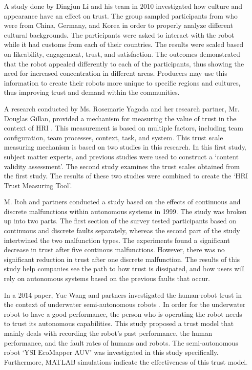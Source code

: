 \documentclass[runningheads,a4paper]{llncs}
\begin{document}
A study done by Dingjun Li and his team in 2010 investigated how culture and appearance have an effect on trust\cite{li2010cross}.  The group sampled participants from who were from China, Germany, and Korea in order to properly analyze different cultural backgrounds.  The participants were asked to interact with the robot while it had customs from each of their countries.  The results were scaled based on likeability, engagement, trust, and satisfaction.  The outcomes demonstrated that the robot appealed differently to each of the participants, thus showing the need for increased concentration in different areas.  Producers may use this information to create their robots more unique to specific regions and cultures, thus improving trust and demand within the communities.

A research conducted by Ms. Rosemarie Yagoda and her research partner, Mr. Douglas Gillan, provided a mechanism for measuring the value of trust in the context of HRI \cite{yagoda2012you}. This measurement is based on multiple factors, including team configuration, team processes, context, task, and system. This trust scale measuring mechanism is based on two studies in this research. In this first study, subject matter experts, and previous studies were used to construct a `content validity assessment'. The second study examines the trust scales obtained from the first study. The results of these two studies were combined to create the `HRI Trust Measuring Tool'.


M. Itoh and partners conducted a study based on the effects of continuous and discrete malfunctions within autonomous systems in 1999\cite{itoh1999trust}.  The study was broken up into two parts.  The first section of the survey tested participants based on continuous and discrete faults separately, whereas the second part of the study intertwined the two malfunction types.  The experiments found a significant decrease in trust after five continous malfunctions.  However, there was no significant reduction in trust after one discrete malfunction.  The results of this study help companies see the path to how trust is dissipated, and how users will rely on autonomous systems based on the previous faults that occur.


In a 2014 paper, Yue Wang and partners investigated the human-robot trust in the context of underwater semi-autonomous robots \cite{wang2014human}. In order for the underwater robot to have a good performance, the person who is operating the robot needs to trust its autonomous capabilities. This study proposed a trust model that mainly deals with recording the robot's past performance, the human performance, and the fault rates of humans and robots. The semi-autonomous robot `YSI EcoMapper AUV' was investigated in this study specifically. Furthermore, MATLAB simulations indicate the effectiveness of this trust model.
\end{document}
